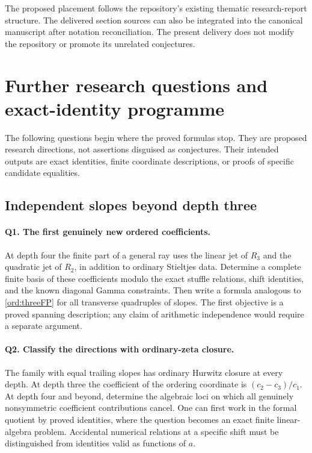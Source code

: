 \documentclass[11pt,letterpaper]{article}
\numberwithin{equation}{section}
\theoremstyle{definition}
\theoremstyle{remark}
\begin{document}
The proposed placement follows the repository's existing thematic
research-report structure. The delivered section sources can also be
integrated into the canonical manuscript after notation reconciliation.
The present delivery does not modify the repository or promote its
unrelated conjectures.



\section{Further research questions and exact-identity programme}
\label{sec:questions}

The following questions begin where the proved formulas stop. They
are proposed research directions, not assertions disguised as
conjectures. Their intended outputs are exact identities, finite
coordinate descriptions, or proofs of specific candidate equalities.

\subsection{Independent slopes beyond depth three}

\paragraph{Q1. The first genuinely new ordered coefficients.}
At depth four the finite part of a general ray uses the linear jet
of $R_3$ and the quadratic jet of $R_2$, in addition to ordinary
Stieltjes data. Determine a complete finite basis of these
coefficients modulo the exact stuffle relations, shift identities,
and the known diagonal Gamma constraints. Then write a formula
analogous to \eqref{ord:threeFP} for all transverse quadruples of
slopes. The first objective is a proved spanning description; any
claim of arithmetic independence would require a separate argument.

\paragraph{Q2. Classify the directions with ordinary-zeta closure.}
The family with equal trailing slopes has ordinary Hurwitz closure
at every depth. At depth three the coefficient of the ordering
coordinate is $(c_2-c_3)/c_1$. At depth four and beyond, determine
the algebraic loci on which all genuinely nonsymmetric coefficient
contributions cancel. One can first work in the formal quotient by
proved identities, where the question becomes an exact finite
linear-algebra problem. Accidental numerical relations at a specific
shift must be distinguished from identities valid as functions of $a$.
\end{document}
